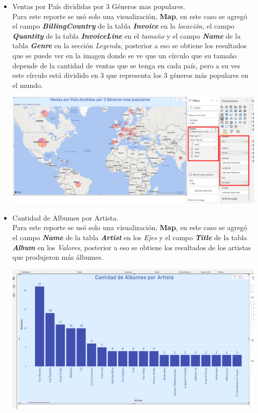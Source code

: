 \documentclass[12pt,letterpaper]{article}
\newcommand\tab[1][1cm]{\hspace*{#1}}
\begin{document}
\begin{enumerate}[\tab 1.]
        \begin{itemize}
            \item Ventas por País divididas por 3 Géneros mas populares.\\[0.1in]
            Para este reporte se usó solo una visualización, \textbf{Map}, en este caso se agregó el campo \textit{\textbf{BillingCountry}} de la tabla \textit{\textbf{Invoice}} en la \textit{locación}, el campo \textit{\textbf{Quantity}} de la tabla \textit{\textbf{InvoiceLine}} en el \textit{tamaño} y el campo \textit{\textbf{Name}} de la tabla \textit{\textbf{Genre}} en la sección \textit{Leyenda}, posterior a eso se obtiene los resultados que se puede ver en la imagen donde se ve que un círculo que su tamaño depende de la cantidad de ventas que se tenga en cada país, pero a su ves este círculo está dividido en 3 que representa los 3 géneros más populares en el mundo.
            \begin{center}
                \includegraphics[width=13cm]{./img/img23.1.png}
            \end{center}
            \item Cantidad de Albumes por Artista.\\[0.1in]
            Para este reporte se usó solo una visualización, \textbf{Map}, en este caso se agregó el campo \textit{\textbf{Name}} de la tabla \textit{\textbf{Artist}} en los \textit{Ejes} y el campo \textit{\textbf{Title}} de la tabla \textit{\textbf{Album}} en los \textit{Valores}, posterior a eso se obtiene los resultados de los artistas que produjeron más álbumes.
            \begin{center}
                \includegraphics[width=13cm]{./img/img23.2.png}

\end{center}
\end{itemize}
\end{enumerate}
\end{document}
